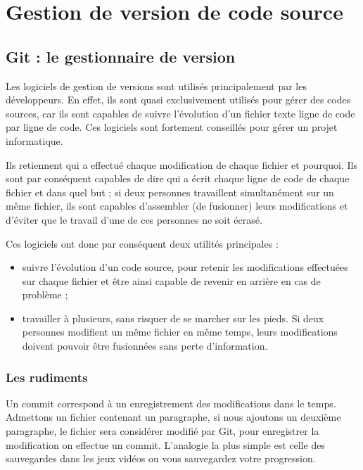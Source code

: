 \chapter{Gestion de version de code source}

\section{Git : le gestionnaire de version}

Les logiciels de gestion de versions sont utilisés principalement par les
développeurs. En effet, ils sont quasi exclusivement utilisés pour gérer des
codes sources, car ils sont capables de suivre l’évolution d’un fichier texte
ligne de code par ligne de code. Ces logiciels sont fortement conseillés pour
gérer un projet informatique.

Ils retiennent qui a effectué chaque modification de chaque fichier et
pourquoi. Ils sont par conséquent capables de dire qui a écrit chaque ligne de
code de chaque fichier et dans quel but ; si deux personnes travaillent
simultanément sur un même fichier, ils sont capables d’assembler (de fusionner)
leurs modifications et d’éviter que le travail d’une de ces personnes ne soit
écrasé.

Ces logiciels ont donc par conséquent deux utilités principales :
\begin{itemize}
    \item suivre l’évolution d’un code source, pour retenir les modifications effectuées sur chaque fichier et être ainsi capable de revenir en arrière en cas de problème ;
    \item travailler à plusieurs, sans risquer de se marcher sur les pieds. Si deux personnes modifient un même fichier en même temps, leurs modifications doivent pouvoir être fusionnées sans perte d’information.
\end{itemize}

\subsection{Les rudiments}

Un commit correspond à un enregistrement des modifications dans le temps.
Admettons un fichier contenant un paragraphe, si nous ajoutons un deuxième
paragraphe, le fichier sera considérer modifié par Git, pour enregistrer la
modification on effectue un commit. L'analogie la plus simple est celle des
sauvegardes dans les jeux vidéos ou vous sauvegardez votre progression.

